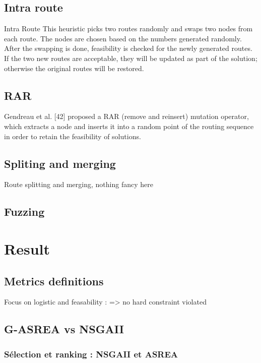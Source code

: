 \documentclass[12pt]{memoir}
\begin{document}
\subsection{Intra route}
Intra Route This heuristic picks two routes randomly and swaps two nodes from each route.
The nodes are chosen based on the numbers generated randomly. After the
swapping is done, feasibility is checked for the newly generated routes. If the
two new routes are acceptable, they will be updated as part of the solution;
otherwise the original routes will be restored.
\subsection{RAR}
Gendreau et al. [42] proposed a RAR (remove and
reinsert) mutation operator, which extracts a node and inserts it into a random point of
the routing sequence in order to retain the feasibility of solutions.
\subsection{Spliting and merging}
Route splitting and merging, nothing fancy here 
\subsection{Fuzzing}

\section{Result}
\subsection{Metrics definitions}
Focus on logistic and feasability : => no hard constraint violated
\subsection{G-ASREA vs NSGAII}
\subsubsection{Sélection et ranking : NSGAII et
	ASREA}\label{suxe9lection-et-ranking-nsgaii-et-asrea}
\end{document}

